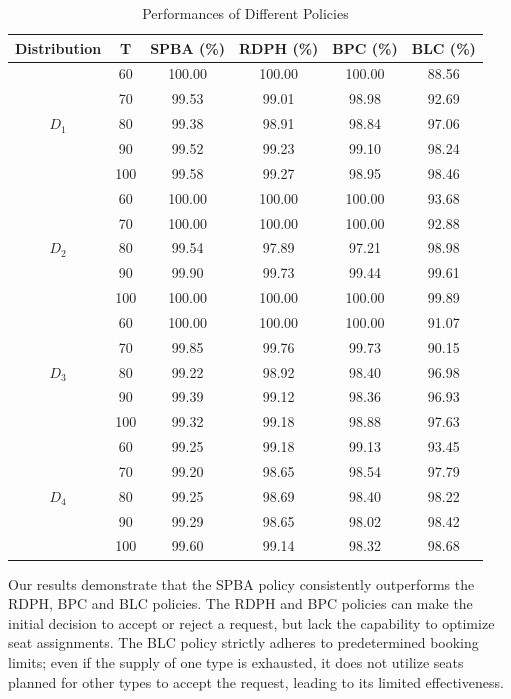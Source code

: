 \begin{table}[h]
  \centering
  \caption{Performances of Different Policies}\label{tab_perf}
  \begin{tabular}{cccccc}
  \hline
  Distribution & T & SPBA (\%) & RDPH (\%) & BPC (\%) & BLC (\%) \\
  \hline
  \multirow{5}{*}{$D_1$} & 60 & 100.00 & 100.00 & 100.00 & 88.56 \\
  & 70    & 99.53 & 99.01 & 98.98 & 92.69  \\
  & 80    & 99.38 & 98.91 & 98.84 & 97.06  \\
  & 90    & 99.52 & 99.23 & 99.10 & 98.24  \\
  & 100   & 99.58 & 99.27 & 98.95 & 98.46 \\
  \hline
  \multirow{5}{*}{$D_2$} & 60  & 100.00 & 100.00 & 100.00 & 93.68  \\
     & 70  & 100.00 & 100.00 & 100.00 & 92.88  \\
     & 80  & 99.54 & 97.89 & 97.21 & 98.98  \\
     & 90  & 99.90 & 99.73 & 99.44 & 99.61  \\
     & 100 & 100.00 & 100.00 & 100.00 & 99.89  \\ 
  \hline
  \multirow{5}{*}{$D_3$} & 60  & 100.00 & 100.00 & 100.00 & 91.07  \\
  & 70  & 99.85 & 99.76 & 99.73 & 90.15 \\
  & 80  & 99.22 & 98.92 & 98.40 & 96.98  \\
  & 90  & 99.39 & 99.12 & 98.36 & 96.93  \\
  & 100  & 99.32 & 99.18 & 98.88 & 97.63  \\
    \hline
    \multirow{5}{*}{$D_4$} & 60  & 99.25 & 99.18 & 99.13 & 93.45  \\
     & 70  & 99.20 & 98.65 & 98.54 & 97.79  \\
     & 80  & 99.25 & 98.69 & 98.40 & 98.22 \\
     & 90  & 99.29 & 98.65 & 98.02 & 98.42  \\
     & 100 & 99.60 & 99.14 & 98.32 & 98.68 \\
  \hline
  \end{tabular}
\end{table}

Our results demonstrate that the SPBA policy consistently outperforms the RDPH, BPC and BLC policies. The RDPH and BPC policies can make the initial decision to accept or reject a request, but lack the capability to optimize seat assignments. The BLC policy strictly adheres to predetermined booking limits; even if the supply of one type is exhausted, it does not utilize seats planned for other types to accept the request, leading to its limited effectiveness.

